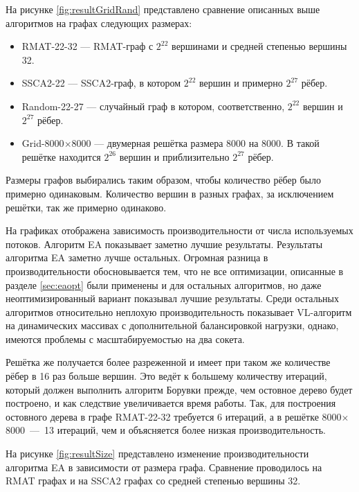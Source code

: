 \documentclass[a4paper,10pt]{extarticle}
\begin{document}



На рисунке \ref{fig:resultGridRand} представлено сравнение описанных выше алгоритмов на графах следующих размерах:
\begin{itemize}
    \item RMAT-22-32 --- RMAT-граф с $2^{22}$ вершинами и средней степенью вершины 32.
    \item SSCA2-22 --- SSCA2-граф, в котором $2^{22}$ вершин и примерно $2^{27}$ рёбер.
    \item Random-22-27 --- случайный граф в котором, соответственно, $2^{22}$ вершин и $2^{27}$ рёбер.
    \item Grid-8000$\times$8000 --- двумерная решётка размера 8000 на 8000. В такой решётке находится $2^{26}$ вершин и приблизительно $2^{27}$ рёбер.
\end{itemize}

Размеры графов выбирались таким образом, чтобы количество рёбер было примерно одинаковым. Количество вершин в разных графах, за исключением решётки, так же примерно одинаково. 

На графиках отображена зависимость производительности от числа используемых потоков.
Алгоритм EA показывает заметно лучшие результаты.
Результаты алгоритма EA заметно лучше остальных. Огромная разница в производительности обосновывается тем, что не все оптимизации, описанные в разделе \ref{sec:eaopt} были применены и для остальных алгоритмов, но даже неоптимизированный вариант показывал лучшие результаты.
Среди остальных алгоритмов относительно неплохую производительность показывает VL-алгоритм на динамических массивах с дополнительной балансировкой нагрузки, однако, имеются проблемы с масштабируемостью на два сокета.

Решётка же получается более разреженной и имеет при таком же количестве рёбер в 16 раз больше вершин. 
Это ведёт к большему количеству итераций, который должен выполнить алгоритм Борувки прежде, чем остовное дерево будет построено, и как следствие увеличивается время работы. Так, для построения остовного дерева в графе RMAT-22-32 требуется 6 итераций, а в решётке 8000$\times$8000~---~13 итераций, чем и объясняется более низкая производительность.




На рисунке \ref{fig:resultSize} представлено изменение производительности алгоритма EA в зависимости от размера графа. Сравнение проводилось на RMAT графах  и на SSCA2 графах со средней степенью вершины 32. 
\end{document}
